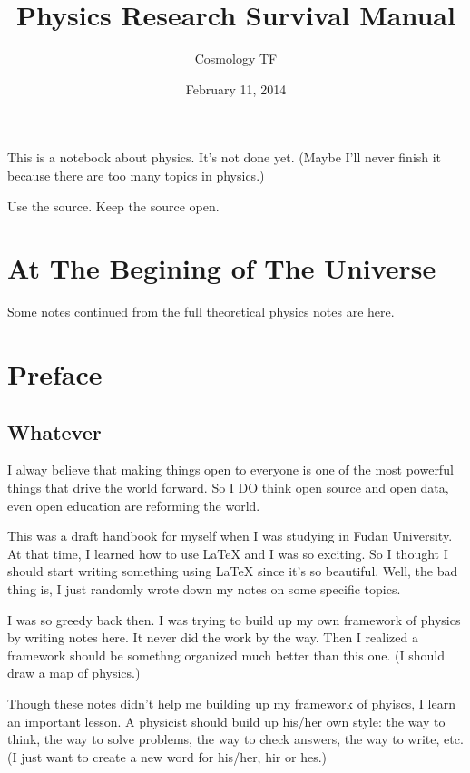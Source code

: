 \documentclass[letterpaper,10pt,english]{sphinxmanual}
\title{Physics Research Survival Manual}
\date{February 11, 2014}
\author{Cosmology TF}
\begin{document}
\maketitle
\tableofcontents
{}\label{index::doc}


This is a notebook about physics. It's not done yet. (Maybe I'll never finish it because there are too many topics in physics.)

Use the source. Keep the source open.


\chapter{At The Begining of The Universe}
\label{index:at-the-begining-of-the-universe}\label{index:welcome-to-physics-research-survival-manual}
Some notes continued from the full theoretical physics notes are \href{http://cosmologytaskforce.github.io/PhysicsResearchSurvivalManual/}{here}.


\chapter{Preface}
\label{index:preface}

\section{Whatever}
\label{preface::doc}\label{preface:whatever}
I alway believe that making things open to everyone is one of the most powerful things that drive the world forward. So I DO think open source and open data, even open education are reforming the world.

This was a draft handbook for myself when I was studying in Fudan University. At that time, I learned how to use LaTeX and I was so exciting. So I thought I should start writing something using LaTeX since it's so beautiful. Well, the bad thing is, I just randomly wrote down my notes on some specific topics.

I was so greedy back then. I was trying to build up my own framework of physics by writing notes here. It never did the work by the way. Then I realized a framework should be somethng organized much better than this one. (I should draw a map of physics.)

Though these notes didn't help me building up my framework of phyiscs, I learn an important lesson. A physicist should build up his/her own style: the way to think, the way to solve problems, the way to check answers, the way to write, etc.  (I just want to create a new word for his/her, hir or hes.)
\end{document}
